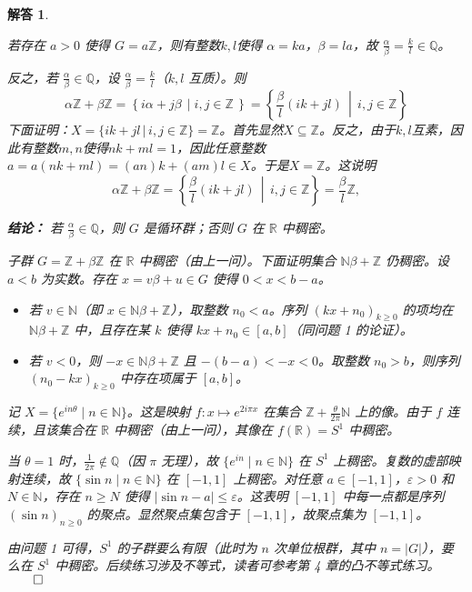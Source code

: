 \documentclass[12pt,UTF8]{ctexbook}
\theoremstyle{exercisestyle}
\theoremstyle{solutionstyle}
\newtheorem*{solution*}{解答}
\newenvironment{solution}
  {\begin{solution*}}
  {\hfill\ensuremath{\qed}\end{solution*}}
\begin{document}
\begin{solution}
\begin{subquestions}
    若存在 \(a > 0\) 使得 \(G = a\mathbb{Z}\)，则有整数$k, l$使得 \(\alpha = k a\)，\(\beta = l a\)，故 \(\frac{\alpha}{\beta} = \frac{k}{l} \in \mathbb{Q}\)。
    
    反之，若 \(\frac{\alpha}{\beta} \in \mathbb{Q}\)，设 \(\frac{\alpha}{\beta} = \frac{k}{l}\)（\(k,l\) 互质）。则
    \[
    \alpha \mathbb{Z} + \beta \mathbb{Z} = \left\{i\alpha + j\beta \, \middle| i, j \in \mathbb{Z}\, \right\} =  \left\{\frac{\beta}{l}(ik + jl) \, \middle| \, i, j \in \mathbb{Z} \right\}
    \]
    下面证明：$X = \{ik + jl \, | \, i, j \in \mathbb{Z} \} = \mathbb{Z}$。首先显然$X\subseteq \mathbb{Z}$。反之，由于$k, l$互素，因此有整数$m,n$使得$nk + ml = 1$，因此任意整数$a = a(nk + ml) = (an)k + (am)l \in X$。于是$X = \mathbb{Z}$。这说明
    $$ \alpha \mathbb{Z} + \beta \mathbb{Z} =  \left\{\frac{\beta}{l}(ik + jl) \, \middle| \, i, j \in \mathbb{Z} \right\} = \frac{\beta}{l}\mathbb{Z}, $$
    
    \textbf{结论：} 若 \(\frac{\alpha}{\beta} \in \mathbb{Q}\)，则 \(G\) 是循环群；否则 \(G\) 在 \(\mathbb{R}\) 中稠密。
    
    \item 子群 \(G = \mathbb{Z} + \beta \mathbb{Z}\) 在 \(\mathbb{R}\) 中稠密（由上一问）。下面证明集合 \(\mathbb{N}\beta + \mathbb{Z}\) 仍稠密。设 \(a < b\) 为实数。存在 \(x = v\beta + u \in G\) 使得 \(0 < x < b - a\)。
    
    \begin{itemize}
      \item 若 \(v \in \mathbb{N}\)（即 \(x \in \mathbb{N}\beta + \mathbb{Z}\)），取整数 \(n_0 < a\)。序列 \((k x + n_0)_{k \geqslant 0}\) 的项均在 \(\mathbb{N}\beta + \mathbb{Z}\) 中，且存在某 \(k\) 使得 \(k x + n_0 \in [a, b]\)（同问题 1 的论证）。
      \item 若 \(v < 0\)，则 \(-x \in \mathbb{N}\beta + \mathbb{Z}\) 且 \(-(b - a) < -x < 0\)。取整数 \(n_0 > b\)，则序列 \((n_0 - k x)_{k \geqslant 0}\) 中存在项属于 \([a, b]\)。
    \end{itemize}
    
    \item 记 \(X = \{ e^{i n \theta} \mid n \in \mathbb{N} \}\)。这是映射 \(f: x \mapsto e^{2i\pi x}\) 在集合 \(\mathbb{Z} + \frac{\theta}{2\pi} \mathbb{N}\) 上的像。由于 \(f\) 连续，且该集合在 \(\mathbb{R}\) 中稠密（由上一问），其像在 \(f(\mathbb{R}) = S^1\) 中稠密。
    
    当 \(\theta = 1\) 时，\(\frac{1}{2\pi} \notin \mathbb{Q}\)（因 \(\pi\) 无理），故 \(\{e^{i n} \mid n \in \mathbb{N}\}\) 在 \(S^1\) 上稠密。复数的虚部映射连续，故 \(\{\sin n \mid n \in \mathbb{N}\}\) 在 \([-1, 1]\) 上稠密。对任意 \(a \in [-1, 1]\)，\(\varepsilon > 0\) 和 \(N \in \mathbb{N}\)，存在 \(n \geqslant N\) 使得 \(|\sin n - a| \leqslant \varepsilon\)。这表明 \([-1, 1]\) 中每一点都是序列 \((\sin n)_{n \geqslant 0}\) 的聚点。显然聚点集包含于 \([-1, 1]\)，故聚点集为 \([-1, 1]\)。
  \end{subquestions}
  
  由问题 1 可得，\(S^1\) 的子群要么有限（此时为 \(n\) 次单位根群，其中 \(n = |G|\)），要么在 \(S^1\) 中稠密。后续练习涉及不等式，读者可参考第 4 章的凸不等式练习。
\end{solution}
\end{document}
